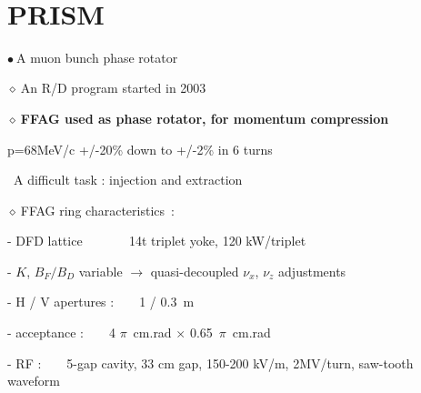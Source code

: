 \documentclass[12pt]{article}
\newcommand{\nib}{\noindent \ensuremath{\bullet~}}
\newcommand{\nid}{\noindent \ensuremath{\diamond~}}
\newcommand{\nin}{\noindent~}
\begin{document}
~ \\[-3ex]
\begin{minipage}{1.\linewidth}

\section{\LARGE PRISM }

\fontsize{15}{19} \selectfont

\nib A muon bunch phase rotator \\[1ex]
\begin{minipage}{.63\linewidth}


\nid An R/D program started in 2003

{\color{magenta}
 \nid {\bf FFAG used as phase rotator, for momentum compression}

\smallskip

 p=68MeV/c +/-20\% down to +/-2\% in 6 turns

\smallskip


 \nin A difficult task :   injection and extraction

}

\bigskip

\nid FFAG ring characteristics~: 

- DFD lattice ~ ~ ~ ~ 14t triplet yoke, 120 kW/triplet


- $K$, $B_F / B_D$  variable $\rightarrow$ quasi-decoupled $\nu_x$, $\nu_z$ adjustments

- H / V apertures : ~ ~ 1 / 0.3~m 

- acceptance : ~ ~  4 $\pi$~cm.rad $\times$ 0.65~$\pi$~cm.rad

- RF :  ~ ~ 5-gap cavity, 33 cm gap, 150-200 kV/m, 2MV/turn, saw-tooth waveform


\end{minipage}
\end{minipage}
\end{document}
